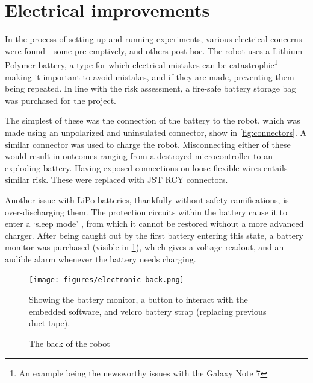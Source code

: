 \documentclass[main.tex]{subfiles}
\begin{document}
\section{Electrical improvements}

In the process of setting up and running experiments, various electrical concerns were found - some pre-emptively, and others post-hoc. The robot uses a Lithium Polymer battery, a type for which electrical mistakes can be catastrophic\footnote{An example being the newsworthy \cite{bbc-samsung-explosion} issues with the Galaxy Note 7} - making it important to avoid mistakes, and if they are made, preventing them being repeated. In line with the risk assessment, a fire-safe battery storage bag was purchased for the project.

The simplest of these was the connection of the battery to the robot, which was made using an unpolarized and uninsulated connector, show in \cref{fig:connectors}. A similar connector was used to charge the robot. Misconnecting either of these would result in outcomes ranging from a destroyed microcontroller to an exploding battery. Having exposed connections on loose flexible wires entails similar risk. These were replaced with JST RCY connectors.

Another issue with LiPo batteries, thankfully without safety ramifications, is over-discharging them. The protection circuits within the battery cause it to enter a `sleep mode' \cite{lipo-sleep-mode}, from which it cannot be restored without a more advanced charger. After being caught out by the first battery entering this state, a battery monitor was purchased (visible in \cref{fig:robot-back}), which gives a voltage readout, and an audible alarm whenever the battery needs charging.

\begin{figure}
	\centering
	\texttt{[image: figures/electronic-back.png]}
	\caption{The back of the robot}
	\label{fig:robot-back}
	\medskip
	\small
	Showing the battery monitor, a button to interact with the embedded software, and velcro battery strap
	(replacing previous duct tape).
\end{figure}
\end{document}
